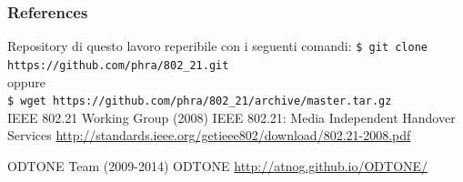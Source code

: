 \documentclass[10pt]{beamer}
\newcommand{\cmduser}[1]{\texttt{\$ #1}\\}
\begin{document}
\begin{frame}
\frametitle{References}
\footnotesize{
\begin{thebibliography}{99} %

 Repository di questo lavoro reperibile con i seguenti comandi:
\newblock \cmduser{git clone https://github.com/phra/802\_21.git}
oppure\\
\cmduser{wget https://github.com/phra/802\_21/archive/master.tar.gz}
\vspace{2em}
 IEEE 802.21 Working Group (2008)
\newblock IEEE 802.21: Media Independent Handover Services
\newblock \url{http://standards.ieee.org/getieee802/download/802.21-2008.pdf}

 ODTONE Team (2009-2014)
\newblock ODTONE
\newblock \url{http://atnog.github.io/ODTONE/}


\end{thebibliography}
}
\end{frame}
\end{document}
